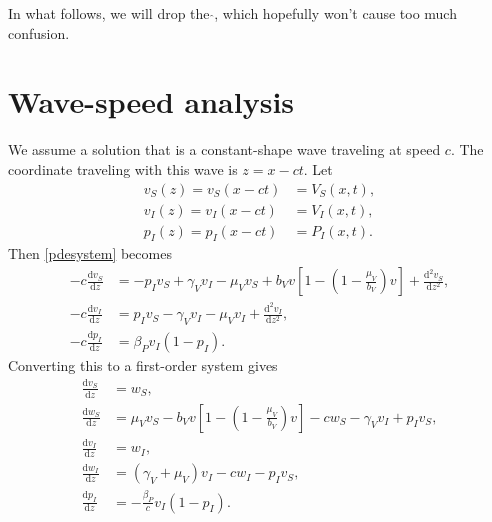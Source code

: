 \documentclass{article}
\newcommand{\md}{\mathrm{d}}
\begin{document}
In what follows, we will drop the $\hat{}$, which hopefully won't
cause too much confusion.

\section{Wave-speed analysis}

We assume a solution that is a constant-shape wave traveling at speed
$c$.  The coordinate traveling with this wave is $z = x - c t$.  Let
\begin{equation}
  \begin{split}
    v_S(z) = v_S(x - c t) &= V_S(x, t),
    \\
    v_I(z) = v_I(x - c t) &= V_I(x, t),
    \\
    p_I(z) = p_I(x - c t) &= P_I(x, t).
  \end{split}
\end{equation}
Then \eqref{pdesystem} becomes
\begin{equation}
  \label{nonlinearode}
  \begin{split}
    - c \frac{\md v_S}{\md z}
    &= - p_I v_S 
    + \gamma_V v_I
    - \mu_V v_S
    + b_V v \left[1 - \left(1 - \frac{\mu_V}{b_V}\right) v\right]
    + \frac{\md^2 v_S}{\md z^2},
    \\
    - c \frac{\md v_I}{\md z}
    &= p_I v_S
    - \gamma_V v_I
    - \mu_V v_I
    + \frac{\md^2 v_I}{\md z^2},
    \\
    - c \frac{\md p_I}{\md z}
    &= \beta_P v_I (1 - p_I).
  \end{split}
\end{equation}
Converting this to a first-order system gives
\begin{equation}
  \label{nonlinear1storderode}
  \begin{split}
    \frac{\md v_S}{\md z} &= w_S,
    \\
    \frac{\md w_S}{\md z}
    &= \mu_V v_S
    - b_V v \left[1 - \left(1 - \frac{\mu_V}{b_V}\right) v\right]
    - c w_S - \gamma_V v_I + p_I v_S,
    \\
    \frac{\md v_I}{\md z} &= w_I,
    \\
    \frac{\md w_I}{\md z}
    &= (\gamma_V + \mu_V) v_I - c w_I - p_I v_S,
    \\
    \frac{\md p_I}{\md z}
    &= - \frac{\beta_P}{c} v_I (1 - p_I).
  \end{split}
\end{equation}
\end{document}
